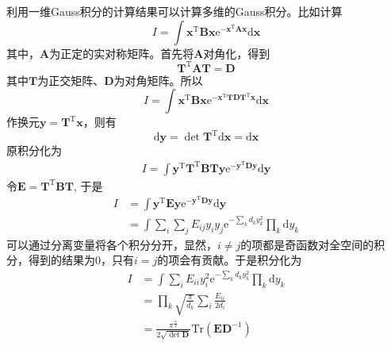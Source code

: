         利用一维Gauss积分的计算结果可以计算多维的Gauss积分。比如计算
        \begin{equation}
            I = \int \bm{x}^\mathrm{T}\bm{Bx} \mathrm{e}^{-\bm{x}^\mathrm{T}\bm{Ax}}\mathrm{d}\bm{x}
        \end{equation}
        其中，$\bm{A}$为正定的实对称矩阵。首先将$\bm{A}$对角化，得到
        \begin{equation}
            \bm{T}^\mathrm{T} \bm{AT} = \bm{D}
        \end{equation}
        其中$\bm{T}$为正交矩阵、$\bm{D}$为对角矩阵。所以
        \begin{equation}
            I = \int \bm{x}^\mathrm{T}\bm{Bx} \mathrm{e}^{-\bm{x}^\mathrm{T}\bm{TDT}^\mathrm{T}\bm{x}}\mathrm{d}\bm{x}
        \end{equation}
        作换元$\bm{y} = \bm{T}^\mathrm{T}\bm{x}$，则有
        \begin{equation}
            \mathrm{d}\bm{y} = \det \bm{T}^\mathrm{T}\mathrm{d}\bm{x} = \mathrm{d}\bm{x}
        \end{equation}
        原积分化为
        \begin{equation}\begin{aligned}
            I = \int \bm{y}^\mathrm{T}\bm{T}^\mathrm{T}\bm{BTy} \mathrm{e}^{-\bm{y}^\mathrm{T}\bm{D}\bm{y}}\mathrm{d}\bm{y}
        \end{aligned}\end{equation}
        令$\bm{E = T}^\mathrm{T}\bm{BT}$, 于是
        \begin{equation}\begin{aligned}
            I &= \int \bm{y}^\mathrm{T}\bm{Ey} \mathrm{e}^{-\bm{y}^\mathrm{T}\bm{D}\bm{y}}\mathrm{d}\bm{y}\\
            &= \int \sum_i \sum_j E_{ij} y_i y_j \mathrm{e}^{-\sum_k d_k y_k^2} \prod_k \mathrm{d}y_k
        \end{aligned}\end{equation}
        可以通过分离变量将各个积分分开，显然，$i \neq j$的项都是奇函数对全空间的积分，得到的结果为0，只有$i=j$的项会有贡献。于是积分化为
        \begin{equation}\begin{aligned}
            I &= \int \sum_i E_{ii} y_i^2 \mathrm{e}^{-\sum_k d_k y_k^2} \prod_k \mathrm{d}y_k\\
            &= \prod_k \sqrt{\frac {\pi}{d_k}} \sum_i \frac {E_{ii}}{2d_i}\\
            &= \frac {\pi^{\frac n2}}{2\sqrt{\det{\bm{D}}}} \mathrm{Tr} (\bm{ED}^{-1})
        \end{aligned}\end{equation}
